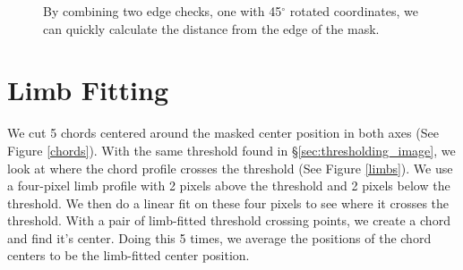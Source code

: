 \documentclass[10pt]{scrartcl}
\begin{document}
\begin{figure}[!ht]
{\begin{subfloatrow}
{        }
        {
        \label{aborder}
        }
    \end{subfloatrow}
}
{\caption{By combining two edge checks, one with 45$^\circ$ rotated coordinates, we can quickly calculate the distance from the edge of the mask.}
\label{cuttingcorners}
}
\end{figure}

\section{Limb Fitting} %
\label{sec:limb_fitting}

We cut 5 chords centered around the masked center position in both axes (See Figure \ref{chords}). With the same threshold found in \S \ref{sec:thresholding_image}, we look at where the chord profile crosses the threshold (See Figure \ref{limbs}). We use a four-pixel limb profile with 2 pixels above the threshold and 2 pixels below the threshold. We then do a linear fit on these four pixels to see where it crosses the threshold. With a pair of limb-fitted threshold crossing points, we create a chord and find it's center. Doing this 5 times, we average the positions of the chord centers to be the limb-fitted center position. 
\end{document}
